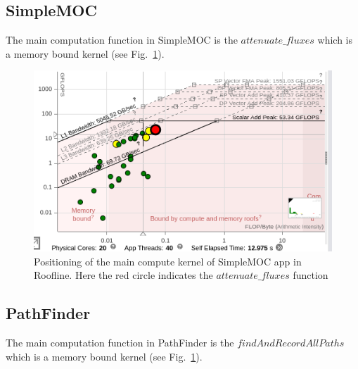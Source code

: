 \subsection{SimpleMOC}
The main computation function in SimpleMOC is the $attenuate\_fluxes$  which is a memory bound kernel (see Fig.~\ref{fig:roof-simplemoc}). 

\begin{figure}[h]%
\begin{center}
\includegraphics[width=1\linewidth]{MEMSYS22/figures/roofline/simplesoc.png}
\end{center}
  \vspace{-0.1in}
\caption{Positioning of the main compute kernel of SimpleMOC app in Roofline. Here the red circle indicates the $attenuate\_fluxes$ function }
\label{fig:roof-simplemoc}
\vspace{-0.2in}
\end{figure}

\subsection{PathFinder}
The main computation function in PathFinder is the $findAndRecordAllPaths$  which is a memory bound kernel (see Fig.~\ref{fig:roof-simplemoc}). 

